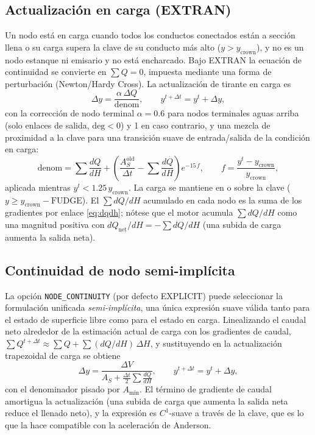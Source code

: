 \documentclass[11pt,a4paper]{article}
\begin{document}
\subsection{Actualización en carga (EXTRAN)}

Un nodo está en carga cuando todos los conductos conectados están a sección
llena o su carga supera la clave de su conducto más alto ($y > y_{\mathrm{crown}}$),
y no es un nodo estanque ni emisario y no está encharcado. Bajo EXTRAN la
ecuación de continuidad se convierte en $\sum Q = 0$, impuesta mediante una
forma de perturbación (Newton/Hardy Cross). La actualización de tirante en
carga es
\begin{equation}
  \Delta y = \frac{\alpha\,\Delta Q}{\mathrm{denom}}, \qquad
  y^{t+\Delta t} = y^{t} + \Delta y,
\end{equation}
con la corrección de nodo terminal $\alpha = 0.6$ para nodos terminales aguas
arriba (solo enlaces de salida, $\mathrm{deg} < 0$) y 1 en caso contrario, y una
mezcla de proximidad a la clave para una transición suave de entrada/salida de
la condición en carga:
\begin{equation}
  \mathrm{denom} = \sum \frac{dQ}{dH} +
  \left(\frac{A_S^{\mathrm{old}}}{\Delta t} - \sum \frac{dQ}{dH}\right)
  e^{-15\,f},
  \qquad f = \frac{y^{t} - y_{\mathrm{crown}}}{y_{\mathrm{crown}}},
\end{equation}
aplicada mientras $y^{t} < 1.25\,y_{\mathrm{crown}}$. La carga se mantiene en o
sobre la clave ($y \ge y_{\mathrm{crown}} - \mathrm{FUDGE}$). El $\sum dQ/dH$
acumulado en cada nodo es la suma de los gradientes por enlace
\eqref{eq:dqdh}; nótese que el motor acumula $\sum dQ/dH$ como una magnitud
positiva con $dQ_{\mathrm{net}}/dH = -\sum dQ/dH$ (una subida de carga aumenta
la salida neta).

\subsection{Continuidad de nodo semi-implícita}

La opción \texttt{NODE\_CONTINUITY} (por defecto EXPLICIT) puede seleccionar la
formulación unificada \emph{semi-implícita}, una única expresión suave válida
tanto para el estado de superficie libre como para el estado en carga.
Linealizando el caudal neto alrededor de la estimación actual de carga con los
gradientes de caudal, $\sum Q^{t+\Delta t} \approx \sum Q + \sum(dQ/dH)\,\Delta H$,
y sustituyendo en la actualización trapezoidal de carga se obtiene
\begin{equation}
  \Delta y = \frac{\Delta V}
    {A_S + \tfrac{\Delta t}{2}\sum \frac{dQ}{dH}}, \qquad
  y^{t+\Delta t} = y^{t} + \Delta y,
\end{equation}
con el denominador pisado por $A_{\min}$. El término de gradiente de caudal
amortigua la actualización (una subida de carga que aumenta la salida neta
reduce el llenado neto), y la expresión es $C^1$-suave a través de la clave,
que es lo que la hace compatible con la aceleración de Anderson.
\end{document}
